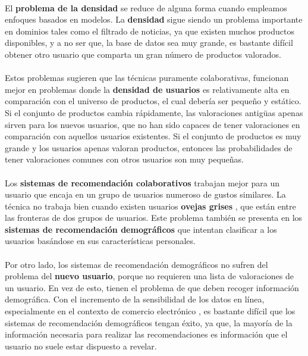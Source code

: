 \documentclass[12pt,letterpaper,oneside] {memoir}
\begin{document}
\paragraph{}
El \textbf{problema de la densidad} se reduce de alguna forma cuando empleamos enfoques basados en modelos. La \textbf{densidad} sigue siendo un problema importante en dominios tales como el filtrado de noticias, ya que existen muchos productos disponibles, y a no ser que, la base de datos sea muy grande, es bastante difícil obtener otro usuario que comparta un gran número de productos valorados.
\paragraph{}
Estos problemas sugieren que las técnicas puramente colaborativas, funcionan mejor en problemas donde la \textbf{densidad de usuarios} es relativamente alta en comparación con el universo de productos, el cual debería ser pequeño y estático. Si el conjunto de productos cambia rápidamente, las valoraciones antigüas apenas sirven para los nuevos usuarios, que no han sido capaces de tener valoraciones en comparación con aquellos usuarios existentes. Si el conjunto de productos es muy grande y los usuarios apenas valoran productos, entonces las probabilidades de tener valoraciones comunes con otros usuarios son muy pequeñas.
\paragraph{}
Los \textbf{sistemas de recomendación colaborativos} trabajan mejor para un usuario que encaja en un grupo de usuarios numeroso de gustos similares. La técnica no trabaja bien cuando existen usuarios \textbf{ovejas grises} \citep{Claypool1999}, que están entre las fronteras de dos grupos de usuarios. Este problema también se presenta en los \textbf{sistemas de recomendación demográficos} que intentan clasificar a los usuarios basándose en sus características personales. 
\paragraph{}
Por otro lado, los sistemas de recomendación demográficos no sufren del problema del \textbf{nuevo usuario}, porque no requieren una lista de valoraciones de un usuario. En vez de esto, tienen el problema de que deben recoger información demográfica. Con el incremento de la sensibilidad de los datos en línea, especialmente en el contexto de comercio electrónico \citep{Information1997}, es bastante difícil que los sistemas de recomendación demográficos tengan éxito, ya que, la mayoría de la información necesaria para realizar las recomendaciones es información que el usuario no suele estar dispuesto a revelar.
\end{document}
